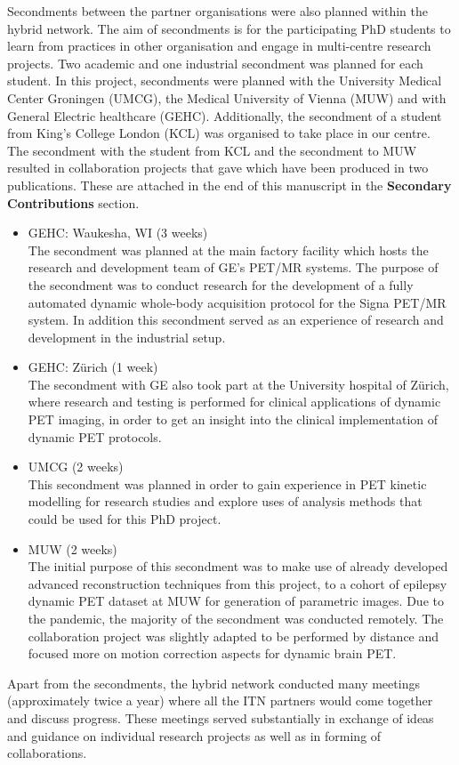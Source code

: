 Secondments between the partner organisations were also planned within the \gls{hybrid} network. The aim of secondments is for the participating PhD students to learn from practices in other organisation and engage in multi-centre research projects. Two academic and one industrial secondment was planned for each student. 
In this project, secondments were planned with the University Medical Center Groningen (UMCG), the Medical University of Vienna (MUW) and with General Electric healthcare (GEHC).
Additionally, the secondment of a student from King's College London (KCL) was organised to take place in our centre. 
The secondment with the student from KCL and the secondment to MUW resulted in collaboration projects that gave which have been produced in two publications. These are attached in the end of this manuscript in the \textbf{Secondary Contributions} section. 

\begin{itemize}
    \item GEHC: Waukesha, WI (3 weeks) \\
    The secondment was planned at the main factory facility which hosts the research and development team of GE's PET/MR systems. The purpose of the secondment was to conduct research for the development of a fully automated dynamic whole-body acquisition protocol for the Signa PET/MR system.
    In addition this secondment served as an experience of research and development in the industrial setup.
    \item GEHC: Zürich (1 week) \\
    The secondment with GE also took part at the University hospital of Zürich, where research and testing is performed for clinical applications of dynamic PET imaging, in order to get an insight into the clinical implementation of dynamic PET protocols.
    \item UMCG (2 weeks) \\
    This secondment was planned in order to gain experience in PET kinetic modelling for research studies and explore uses of analysis methods that could be used for this PhD project. 
    \item MUW (2 weeks) \\
    The initial purpose of this secondment was to make use of already developed advanced reconstruction techniques from this project, to a cohort of epilepsy dynamic PET dataset at MUW for generation of parametric images. Due to the pandemic, the majority of the secondment was conducted remotely. The collaboration project was slightly adapted to be performed by distance and focused more on motion correction aspects for dynamic brain PET.
    
\end{itemize}

Apart from the secondments, the \gls{hybrid} network conducted many meetings (approximately twice a year) where all the ITN partners would come together and discuss progress. These meetings served substantially in exchange of ideas and guidance on individual research projects as well as in forming of collaborations. 

